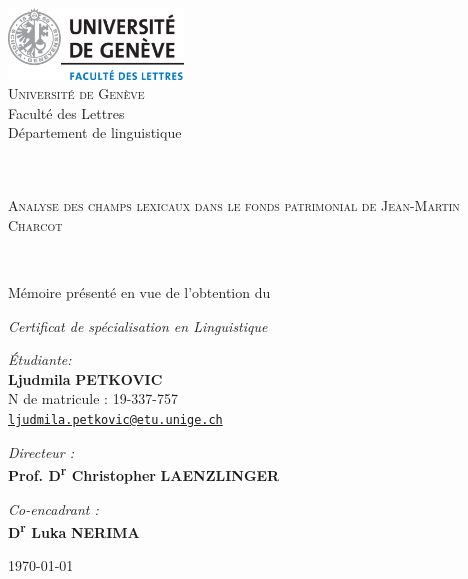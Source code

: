 \begin{titlepage}
\begin{center}

\includegraphics[width=0.35\textwidth]{img/unige_lettres_logo.png}~\\[1cm]

\large \textsc{Université de Genève}\\Faculté des Lettres\\
Département de linguistique

\textsc{\Large }\\[0.5cm]

\HRule \\[0.4cm]

{\huge \textsc{Analyse des champs lexicaux dans le fonds patrimonial de Jean-Martin Charcot} \\[0.4cm] }

\HRule \\[1.5cm]
\large{Mémoire présenté en vue de l'obtention du\medskip

\Large \textit{Certificat de spécialisation en Linguistique}\vspace{2cm}}

\begin{minipage}{1\textwidth}
\begin{flushleft} \large
\emph{Étudiante:}\\
\textbf{Ljudmila} \textsc{\textbf{PETKOVIC}}\\
\small{N\textdegree{} de matricule : 19-337-757\\\href{mailto:ljudmila.petkovic@etu.unige.ch}{\texttt{ljudmila.petkovic@etu.unige.ch}}}
\end{flushleft}
\end{minipage}
\begin{minipage}{1\textwidth}
\begin{flushright} \large
\emph{Directeur :} \\
\textbf{Prof. D\textsuperscript{r} Christopher} \textsc{\textbf{LAENZLINGER}}

\medskip
\emph{Co-encadrant :} \\
\textbf{D\textsuperscript{r} Luka} \textsc{\textbf{NERIMA}}
\end{flushright}
\end{minipage}

\vfill

{\large \today}

\end{center}
\end{titlepage}
